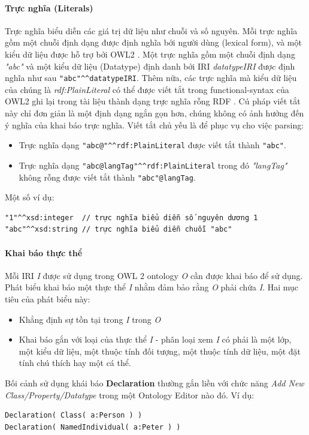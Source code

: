 \paragraph{Trực nghĩa (Literals)}
Trực nghĩa biểu diễn các giá trị dữ liệu như chuỗi và số nguyên. Mỗi trực nghĩa gồm một chuỗi định dạng được định nghĩa bới người dùng (lexical form), và một kiểu dữ liệu được hỗ trợ bởi OWL2 \cite{owl2spec}. Một trực nghĩa gồm một chuỗi định dạng \textit{"abc"} và một kiểu dữ liệu (Datatype) định danh bởi IRI \textit{datatypeIRI} được định nghĩa như sau \verb|"abc"^^datatypeIRI|. Thêm nữa, các trực nghĩa mà kiểu dữ liệu của chúng là \textit{rdf:PlainLiteral} có thể được viết tắt trong functional-syntax của OWL2 ghi lại trong tài liệu thành dạng trực nghĩa rỗng RDF \cite{rdf_concept}. Cú pháp viết tắt này chỉ đơn giản là một định dạng ngắn gọn hơn, chúng không có ảnh hưởng đến ý nghĩa của khai báo trực nghĩa. Viết tắt chủ yếu là để phục vụ cho việc parsing:
\begin{itemize}
	\item Trực nghĩa dạng \verb|"abc@"^^rdf:PlainLiteral| được viết tắt thành \verb|"abc"|.
	\item Trực nghĩa dạng \verb|"abc@langTag"^^rdf:PlainLiteral| trong đó \textit{"langTag"} không rỗng được viết tắt thành \verb|"abc"@langTag|.
\end{itemize}
Một số ví dụ:
\begin{verbatim}
"1"^^xsd:integer  // trực nghĩa biểu diễn số nguyên dương 1
"abc"^^xsd:string // trực nghĩa biểu diễn chuỗi "abc"
\end{verbatim}

\paragraph{Khai báo thực thể}
Mỗi IRI \textit{I} được sử dụng trong OWL 2 ontology \textit{O} cần được khai báo để sử dụng. Phát biểu khai báo một thực thể \textit{I} nhằm đảm bảo rằng \textit{O} phải chứa \textit{I}. Hai mục tiêu của phát biểu này:
\begin{itemize}
	\item Khẳng định sự tồn tại trong \textit{I} trong \textit{O}
	\item Khai báo gắn với loại của thực thể \textit{I} - phân loại xem \textit{I} có phải là một lớp, một kiểu dữ liệu, một thuộc tính đối tượng, một thuộc tính dữ liệu, một đặt tính chú thích hay một cá thể.
\end{itemize}
Bối cảnh sử dụng khái báo \textbf{Declaration} thường gắn liền với chức năng \textit{Add New Class/Property/Datatype} trong một Ontology Editor nào đó. Ví dụ:
\begin{verbatim}
Declaration( Class( a:Person ) )
Declaration( NamedIndividual( a:Peter ) )
\end{verbatim}

